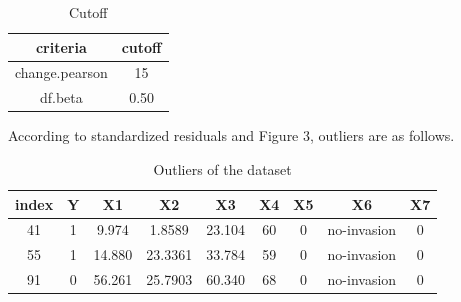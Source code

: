 \documentclass[a4paper,11pt,onecolumn,twoside]{article}
\begin{document}
\begin{table}[H]
	\centering
	\begin{tabular}{cc}
		\midrule[1.5pt]
		criteria&cutoff\\
		\hline 
		change.pearson&15\\
		df.beta&0.50\\
		\midrule[1.5pt]
	\end{tabular}
	\caption{Cutoff}
\end{table}
According to standardized residuals and Figure 3, outliers are as follows.\par
\begin{table}[H]
	\centering
	\begin{tabular}{ccccccccc}
		\midrule[1.5pt]
		index &Y  &X1   &X2   &X3  &X4   &X5   &X6    &X7\\
		\hline 
		41& 1&  9.974&  1.8589& 23.104& 60&  0& no-invasion&  0\\
		55& 1& 14.880& 23.3361& 33.784& 59&  0& no-invasion&  0\\
		91& 0& 56.261& 25.7903& 60.340& 68&  0& no-invasion&  0\\
		\midrule[1.5pt]
	\end{tabular}
	\caption{Outliers of the dataset}
\end{table}
\end{document}
